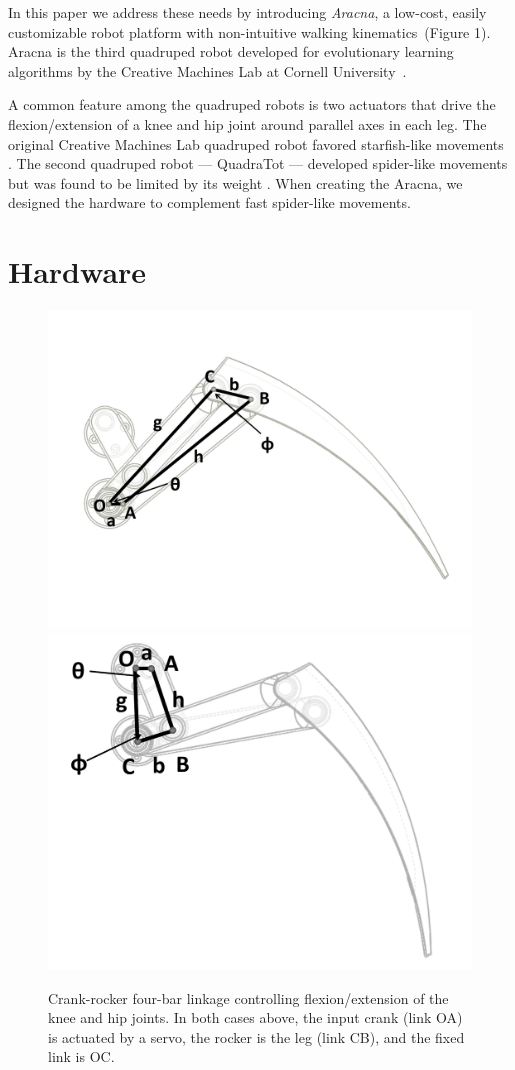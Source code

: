 \documentclass[letterpaper]{article}
\begin{document}
In this paper we address these needs by introducing \emph{Aracna}, a low-cost, easily customizable robot platform with non-intuitive walking
kinematics~(Figure 1). Aracna is the third quadruped robot developed for evolutionary learning algorithms by the Creative Machines Lab at Cornell University~\citep{HL, JY}. 


A common feature among the quadruped
robots is two actuators that drive the flexion/extension of a knee and
hip joint around parallel axes in each leg. The original Creative
Machines Lab quadruped robot favored starfish-like movements
\citep{HL}. The second quadruped robot --- QuadraTot ---
developed spider-like movements but was found to be limited by its
weight \citep{JY}. When creating the Aracna, we designed the hardware to
complement fast spider-like movements.




\section{Hardware}

\begin{figure}[t]
\begin{center}
\includegraphics[width=.23\textwidth]{fig3.pdf}
\includegraphics[width=.23\textwidth]{fig4.pdf}
\caption{Crank-rocker four-bar linkage controlling flexion/extension of
  the knee and hip joints. In both cases above, the input crank (link
  OA) is actuated by a servo, the rocker is the leg (link CB), and the
  fixed link is OC.}
\label{fig3}
\end{center}
\end{figure}

\end{document}
